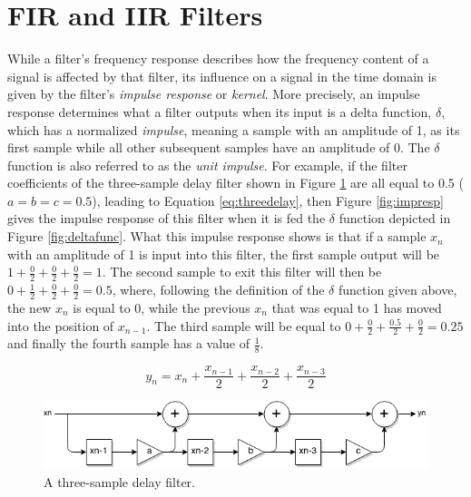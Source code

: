 \documentclass[12pt,twoside]{report}
\begin{document}
\pagebreak

\section{FIR and IIR Filters}

\noindent While a filter's frequency response describes how the frequency content of a signal is affected by that filter, its influence on a signal in the time domain is given by the filter's \emph{impulse response} or \emph{kernel}. More precisely, an impulse response determines what a filter outputs when its input is a delta function, $\delta$, which has a normalized \emph{impulse}, meaning a sample with an amplitude of 1, as its first sample while all other subsequent samples have an amplitude of 0. The $\delta$ function is also referred to as the \emph{unit impulse}.  For example, if the filter coefficients of the three-sample delay filter shown in Figure \ref{fig:threedelay} are all equal to 0.5 ($a = b = c = 0.5$), leading to Equation \ref{eq:threedelay}, then Figure \ref{fig:impresp} gives the impulse response of this filter when it is fed the $\delta$ function depicted in Figure \ref{fig:deltafunc}. What this impulse response shows is that if a sample $x_{n}$ with an amplitude of 1 is input into this filter, the first sample output will be $1 + \frac{0}{2}+ \frac{0}{2}+ \frac{0}{2} = 1$. The second sample to exit this filter will then be $0 + \frac{1}{2}+ \frac{0}{2}+ \frac{0}{2} = 0.5$, where, following the definition of the $\delta$ function given above, the new $x_{n}$ is equal to 0, while the previous $x_{n}$ that was equal to 1 has moved into the position of $x_{n-1}$. The third sample will be equal to $0 + \frac{0}{2} + \frac{0.5}{2}+ \frac{0}{2} = 0.25$ and finally the fourth sample has a value of $\frac{1}{8}$.

\begin{equation}
  y_{n} = x_{n} + \frac{x_{n-1}}{2}+ \frac{x_{n-2}}{2}+ \frac{x_{n-3}}{2}
  \label{eq:threedelay}
\end{equation}

\begin{figure}
  \includegraphics[scale=0.7]{img/threedelay}
  \caption{A three-sample delay filter.}
  \label{fig:threedelay}
\end{figure}
\end{document}
